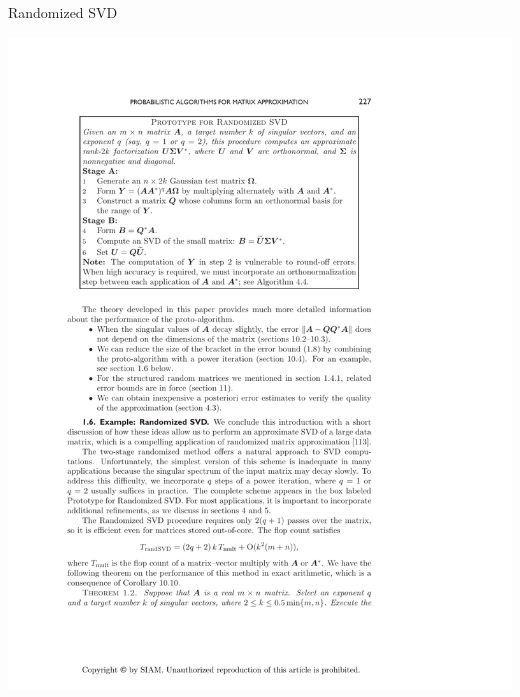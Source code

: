 \begin{frame}[fragile]
\fontsize{8pt}{10}\selectfont
\begin{block}{Randomized SVD\footnotemark}
  \begin{minipage}{.55\textwidth}
    \begin{center}
      \includegraphics[width=.95\textwidth]{pics/randSVDalg}
      \\

\end{center}
\end{minipage}
\end{block}
\end{frame}
